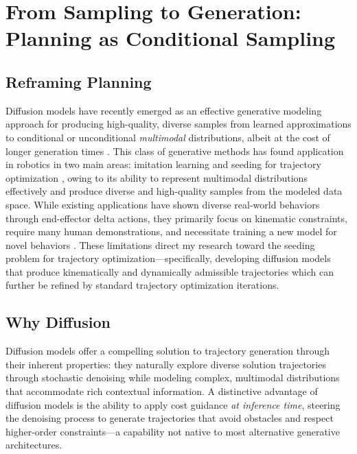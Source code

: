\chapter{From Sampling to Generation: Planning as Conditional Sampling}
\label{ch:generation}

\section{Reframing Planning}
\label{sec:generation:reframing}

Diffusion models have recently emerged as an effective generative modeling approach for producing high-quality, diverse samples from learned approximations to conditional or unconditional \textsl{multimodal} distributions, albeit at the cost of longer generation times \cite{sohl2015deep,ho2020denoising,rombach2022high,nichol2021glide}.
This class of generative methods has found application in robotics in two main areas: imitation learning \cite{chi2023diffusionpolicy,sridhar2024nomad} and seeding for trajectory optimization \cite{carvalho2023motion,huang2024diffusionseeder}, owing to its ability to represent multimodal distributions effectively and produce diverse and high-quality samples from the modeled data space.
While existing applications have shown diverse real-world behaviors through end-effector delta actions, they primarily focus on kinematic constraints, require many human demonstrations, and necessitate training a new model for novel behaviors \cite{chi2023diffusionpolicy,ajay2023is,ha2023scaling,ze20243d}. These limitations direct my research toward the seeding problem for trajectory optimization---specifically, developing diffusion models that produce kinematically and dynamically admissible trajectories which can further be refined by standard trajectory optimization iterations.

\section{Why Diffusion}
\label{sec:generation:diffusion}

Diffusion models offer a compelling solution to trajectory generation through their inherent properties: they naturally explore diverse solution trajectories through stochastic denoising \cite{chi2023diffusionpolicy} while modeling complex, multimodal distributions that accommodate rich contextual information. A distinctive advantage of diffusion models is the ability to apply cost guidance \textsl{at inference time}, steering the denoising process to generate trajectories that avoid obstacles and respect higher-order constraints---a capability not native to most alternative generative architectures.

